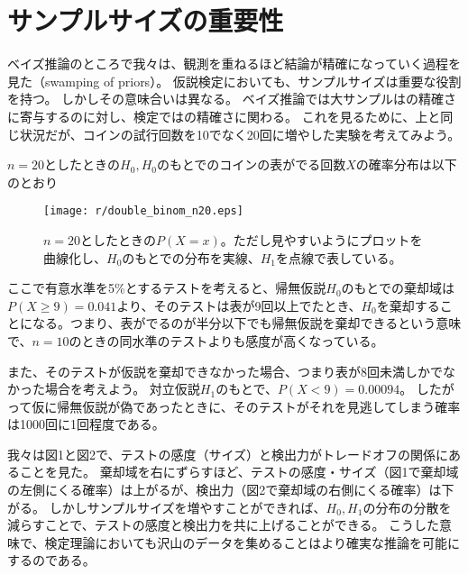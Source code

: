 \documentclass{jsarticle}
\begin{document}
\section{サンプルサイズの重要性}
ベイズ推論のところで我々は、観測を重ねるほど結論が精確になっていく過程を見た（swamping of priors）。
仮説検定においても、サンプルサイズは重要な役割を持つ。
しかしその意味合いは異なる。
ベイズ推論では大サンプルはの精確さに寄与するのに対し、検定ではの精確さに関わる。
これを見るために、上と同じ状況だが、コインの試行回数を10でなく20回に増やした実験を考えてみよう。

$n=20$としたときの$H_0, H_0$のもとでのコインの表がでる回数$X$の確率分布は以下のとおり
\begin{figure}[h]
 \centering
 \texttt{[image: r/double\_binom\_n20.eps]}
 \caption{$n=20$としたときの$P(X=x)$。ただし見やすいようにプロットを曲線化し、$H_0$のもとでの分布を実線、$H_1$を点線で表している。}
\end{figure}

ここで有意水準を5\%とするテストを考えると、帰無仮説$H_0$のもとでの棄却域は$P(X \geq 9)=0.041$より、そのテストは表が9回以上でたとき、$H_0$を棄却することになる。つまり、表がでるのが半分以下でも帰無仮説を棄却できるという意味で、$n=10$のときの同水準のテストよりも感度が高くなっている。

また、そのテストが仮説を棄却できなかった場合、つまり表が8回未満しかでなかった場合を考えよう。
対立仮説$H_1$のもとで、$P(X < 9)= 0.00094$。
したがって仮に帰無仮説が偽であったときに、そのテストがそれを見逃してしまう確率は1000回に1回程度である。

我々は図1と図2で、テストの感度（サイズ）と検出力がトレードオフの関係にあることを見た。
棄却域を右にずらすほど、テストの感度・サイズ（図1で棄却域の左側にくる確率）は上がるが、検出力（図2で棄却域の右側にくる確率）は下がる。
しかしサンプルサイズを増やすことができれば、$H_0, H_1$の分布の分散を減らすことで、テストの感度と検出力を共に上げることができる。
こうした意味で、検定理論においても沢山のデータを集めることはより確実な推論を可能にするのである。
\end{document}
